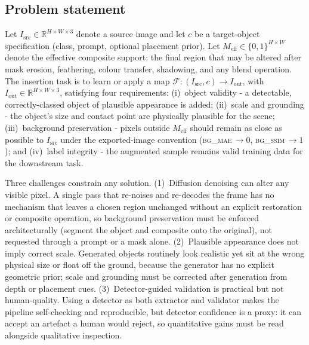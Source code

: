 \documentclass[11pt,a4paper]{article}
\newcommand{\bgmae}{\textsc{bg\_mae}\xspace}
\newcommand{\bgssim}{\textsc{bg\_ssim}\xspace}
\begin{document}
\subsection*{Problem statement}
Let $I_{\mathrm{src}} \in \mathbb{R}^{H\times W\times 3}$ denote a source image
and let $c$ be a target-object specification (class, prompt, optional placement
prior). Let $M_{\mathrm{eff}}
\in\{0,1\}^{H\times W}$ denote the effective composite support: the
final region that may be altered after mask erosion, feathering, colour transfer,
shadowing, and any blend operation. The insertion task is to learn or apply a map
$\mathcal{F}\!:\!(I_{\mathrm{src}}, c) \to I_{\mathrm{out}}$, with
$I_{\mathrm{out}}\in\mathbb{R}^{H\times W\times 3}$, satisfying four
requirements: (i)~object validity - a detectable, correctly-classed
object of plausible appearance is added; (ii)~scale and grounding -
the object's size and contact point are physically plausible for the scene;
(iii)~background preservation - pixels outside $M_{\mathrm{eff}}$
should remain as close as possible to $I_{\mathrm{src}}$ under the
exported-image convention (\bgmae$\,\to 0$, \bgssim$\,\to 1$); and
(iv)~label integrity - the augmented sample remains valid training
data for the downstream task.

\noindent Three challenges constrain any solution.
(1)~Diffusion denoising can alter any visible pixel. A single pass that
re-noises and re-decodes the frame has no mechanism that leaves a chosen region
unchanged without an explicit restoration or composite operation, so background
preservation must be enforced architecturally (segment the object and composite onto
the original), not requested through a prompt or a mask alone. (2)~Plausible appearance does not imply correct scale.
Generated objects routinely look realistic yet sit at the wrong physical size or
float off the ground, because the generator has no explicit geometric prior; scale
and grounding must be corrected after generation from depth or placement cues.
(3)~Detector-guided validation is practical but not human-quality. Using
a detector as both extractor and validator makes the pipeline self-checking and
reproducible, but detector confidence is a proxy: it can accept an artefact a
human would reject, so quantitative gains must be read alongside qualitative
inspection.
\end{document}
